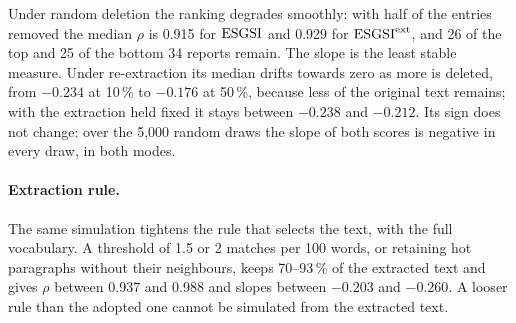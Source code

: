Under random deletion the ranking degrades smoothly: with half of the entries
removed the median $\rho$ is 0.915 for $\mathrm{ESGSI}$ and 0.929 for $\mathrm{ESGSI}^{\mathrm{ext}}$,
and 26 of the top and 25 of the bottom 34 reports remain. The slope is the
least stable measure. Under re-extraction its median drifts towards zero as
more is deleted, from $-0.234$ at 10\,\% to $-0.176$ at 50\,\%, because less
of the original text remains; with the extraction held fixed it stays between
$-0.238$ and $-0.212$. Its sign does not change: over the 5{,}000 random
draws the slope of both scores is negative in every draw, in both modes.

\paragraph{Extraction rule.} The same simulation tightens the rule that
selects the text, with the full vocabulary. A threshold of 1.5 or 2 matches
per 100 words, or retaining hot paragraphs without their neighbours, keeps
70--93\,\% of the extracted text and gives $\rho$ between 0.937 and 0.988 and
slopes between $-0.203$ and $-0.260$. A looser rule than the adopted one
cannot be simulated from the extracted text.

